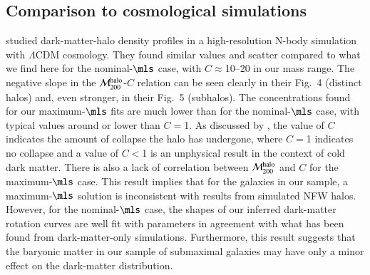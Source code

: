 \documentclass[traditabstract]{aa} %
\begin{document}


\subsection{Comparison to cosmological simulations}
\cite{bullock2001} studied dark-matter-halo density profiles in a high-resolution N-body
simulation with $\Lambda$CDM cosmology. They found similar values and scatter compared 
to what we find here for the nominal-$\mls$ case, with $C$$\approx$10--20 in our mass
range. The negative slope in the $\mathcal{M}_{200}^{\rm halo}$-$C$ relation can be seen 
clearly in their Fig.~4 (distinct halos) and, even stronger, in their Fig.~5 (subhalos).
The concentrations found for our maximum-$\mls$ fits are much lower than for the 
nominal-$\mls$ case, with typical values around or lower than $C$$=$1. As discussed by
\cite{deBlok2008}, the value of $C$ indicates the amount of collapse the halo has
undergone, where $C$$=$1 indicates no collapse and a value of $C$$<$1 is an unphysical
result in the context of cold dark matter. There is also a lack of correlation between
$\mathcal{M}_{200}^{\rm halo}$ and $C$ for the maximum-$\mls$ case. This result
implies that for the galaxies in our sample, a maximum-$\mls$ solution is
inconsistent with results from simulated NFW halos.
%
However, for the nominal-$\mls$ case, the shapes of our inferred dark-matter rotation
curves are well fit with parameters in agreement with what has been found from 
dark-matter-only simulations. Furthermore, this result suggests that the baryonic matter
in our sample of submaximal galaxies may have only a minor effect on the dark-matter
distribution.





\end{document}
